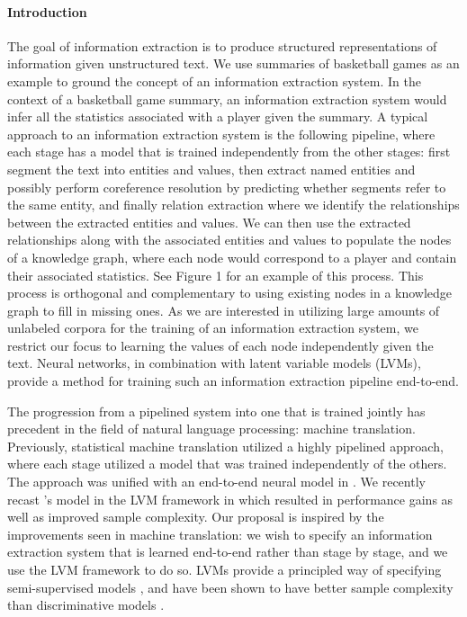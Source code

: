 \documentclass[12pt]{article}
\begin{document}
\paragraph{Introduction}
The goal of information extraction is to produce structured representations of information
given unstructured text.
We use summaries of basketball games as an example to ground the concept of an
information extraction system.
In the context of a basketball game summary, an information extraction system
would infer all the statistics associated with a player given the summary.
A typical approach to an information extraction system is the following pipeline,
where each stage has a model that is trained independently from the other stages:
first segment the text into entities and values,
then extract named entities and possibly perform
coreference resolution by predicting whether segments refer to the same entity, 
and finally relation extraction where we identify the relationships between the extracted
entities and values.
We can then use the extracted relationships along with the associated entities and values
to populate the nodes of a knowledge graph, where each node would
correspond to a player and contain their associated statistics.
See Figure 1 for an example of this process.
This process is orthogonal and complementary to using existing nodes in a knowledge graph
to fill in missing ones.
As we are interested in utilizing large amounts of unlabeled corpora for 
the training of an information extraction system, we restrict our focus
to learning the values of each node independently given the text.
Neural networks, in combination with latent variable models (LVMs),
provide a method for training such an information extraction pipeline end-to-end.

The progression from a pipelined system into one that is trained jointly
has precedent in the field of natural language processing: machine translation.
Previously, statistical machine translation utilized a highly pipelined approach,
where each stage utilized a model that was trained independently of the others.
The approach was unified with an end-to-end neural model in \citet{bahdanau2014mt}.
We recently recast \citet{bahdanau2014mt}'s model in the LVM framework in
\citet{deng2018attn} which resulted in performance gains as well as improved
sample complexity.
Our proposal is inspired by the improvements seen in machine translation:
we wish to specify an information
extraction system that is learned end-to-end rather than stage by stage,
and we use the LVM framework to do so.
LVMs provide a principled way of specifying semi-supervised models \citep{kingma2014ssvae},
and have been shown to have better sample complexity than discriminative models
\citep{deng2018attn,ng2001discgen}.
\end{document}
